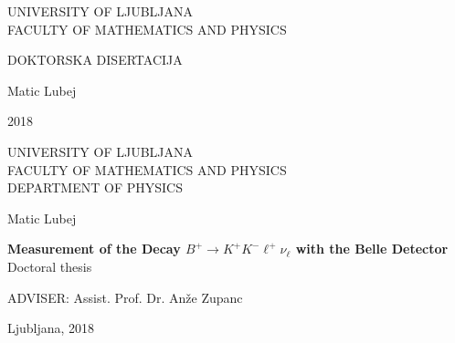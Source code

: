 \documentclass[longbibliography,a4paper,12pt]{book}
\begin{document}
\nocite{*}
\renewcommand{\arraystretch}{1.5}


\pagestyle{empty}
\begin{center}

{\large UNIVERSITY OF LJUBLJANA\\
FACULTY OF MATHEMATICS AND PHYSICS
}

\vspace{9cm}

{\LARGE DOKTORSKA DISERTACIJA}

\vfill

{\hfill \large Matic Lubej}

\vspace{1cm}
{\large 2018}

\cleardoublepage

\end{center}



\pagestyle{empty}
\begin{center}

{\large UNIVERSITY OF LJUBLJANA\\
FACULTY OF MATHEMATICS AND PHYSICS\\
DEPARTMENT OF PHYSICS\\}

\vspace{4cm}

{\Large Matic Lubej\\}

\vspace{10mm}

{\bf \Large Measurement of the Decay $B^+ \to K^+K^-\ell^+\nu_\ell$ with the Belle Detector\\}
\vspace{5mm}
{\large Doctoral thesis}\\

\vfill

{\large ADVISER: Assist. Prof. Dr. An\v ze Zupanc\\
}

\vspace{2cm}
{\large Ljubljana, 2018}

\end{center}

\end{document}
